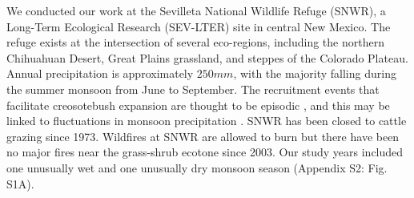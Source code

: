 \documentclass[11pt]{article}\usepackage[]{graphicx}\usepackage[usenames,dvipsnames]{xcolor}
\begin{document}
We conducted our work at the Sevilleta National Wildlife Refuge (SNWR), a Long-Term Ecological Research (SEV-LTER) site in central New Mexico.
The refuge exists at the intersection of several eco-regions, including the northern Chihuahuan Desert, Great Plains grassland, and steppes of the Colorado Plateau.
Annual precipitation is approximately $250 mm$, with the majority falling during the summer monsoon from June to September.
The recruitment events that facilitate creosotebush expansion are thought to be episodic \citep{peters2012long}, and this may be linked to fluctuations in monsoon precipitation \citep{boyd1983postdispersal, bowers2004temporal}.
SNWR has been closed to cattle grazing since 1973.
Wildfires at SNWR are allowed to burn but there have been no major fires near the grass-shrub ecotone since 2003.
Our study years included one unusually wet and one unusually dry monsoon season (Appendix S2: Fig. S1A).

\end{document}
